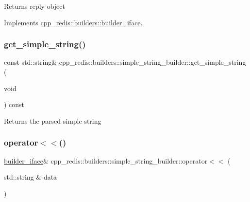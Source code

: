 \begin{DoxyReturn}{Returns}
reply object 
\end{DoxyReturn}


Implements \hyperlink{classcpp__redis_1_1builders_1_1builder__iface_afd2ff2c2371c2a486116543b638b9413}{cpp\+\_\+redis\+::builders\+::builder\+\_\+iface}.

\mbox{\label{classcpp__redis_1_1builders_1_1simple__string__builder_a539ba8a9234269e57471f1973adc58c2}} 
\subsubsection{\texorpdfstring{get\+\_\+simple\+\_\+string()}{get\_simple\_string()}}
{\footnotesize\ttfamily const std\+::string\& cpp\+\_\+redis\+::builders\+::simple\+\_\+string\+\_\+builder\+::get\+\_\+simple\+\_\+string (\begin{DoxyParamCaption}\item[{void}]{ }\end{DoxyParamCaption}) const}

\begin{DoxyReturn}{Returns}
the parsed simple string 
\end{DoxyReturn}
\mbox{\label{classcpp__redis_1_1builders_1_1simple__string__builder_a159bb512f0427c4a988742f7cd01035e}} 
\subsubsection{\texorpdfstring{operator$<$$<$()}{operator<<()}}
{\footnotesize\ttfamily \hyperlink{classcpp__redis_1_1builders_1_1builder__iface}{builder\+\_\+iface}\& cpp\+\_\+redis\+::builders\+::simple\+\_\+string\+\_\+builder\+::operator$<$$<$ (\begin{DoxyParamCaption}\item[{std\+::string \&}]{data }\end{DoxyParamCaption})\hspace{0.3cm}{\ttfamily [virtual]}}

